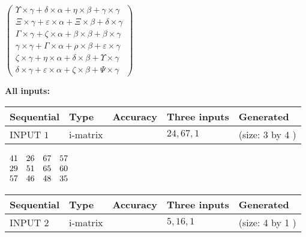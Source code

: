\documentclass[12pt]{article}
\begin{document}
   
 $   \left( \begin{array}
 {
 c
 }
 \Upsilon \times  \gamma   +  \delta \times  \alpha   +  \eta \times  \beta   +  \gamma \times  \gamma \\ 
                    \Xi \times  \gamma   +  \varepsilon \times  \alpha   +                     \Xi \times  \beta   +  \delta \times  \gamma \\ 
 \Gamma \times  \gamma   +                     \zeta \times  \alpha   +  \beta \times  \beta   +  \beta \times  \gamma \\ 
 \gamma \times  \gamma   +  \Gamma \times  \alpha   +  \rho \times  \beta   +  \varepsilon \times  \gamma \\ 
                    \zeta \times  \gamma   +  \eta \times  \alpha   +  \delta \times  \beta   +  \Upsilon \times  \gamma \\ 
 \delta \times  \gamma   +  \varepsilon \times  \alpha   +                     \zeta \times  \beta   +  \Psi \times  \gamma
 \end{array} \right) $ 
   
   
\noindent\vspace{0.1in}\hspace{-0.08in} {\textbf{\Large{All inputs: }}}
   
   
  
  
\noindent\begin{tabular}{|l|l|l|l|l|}
\hline
 Sequential & Type & Accuracy & Three inputs & Generated \\ 
\hline
 
 
  INPUT $  1 $ & i-matrix &  & $
 24
 , 
 67
 , 
 1
 $ & (size:  3  by  4 )
 \\  \hline  
 \end{tabular}
   
   
 $\begin{array}{
 c
 c
 c
 c
 }
 41  & 
 26  & 
 67  & 
 57  \\ 
 29  & 
 51  & 
 65  & 
 60  \\ 
 57  & 
 46  & 
 48  & 
 35
\end{array}  $ 
  
  
\noindent\begin{tabular}{|l|l|l|l|l|}
\hline
 Sequential & Type & Accuracy & Three inputs & Generated \\ 
\hline
 
 
  INPUT $  2 $ & i-matrix &  & $
 5
 , 
 16
 , 
 1
 $ & (size:  4  by  1 )
 \\  \hline  
 \end{tabular}
   
\end{document}

